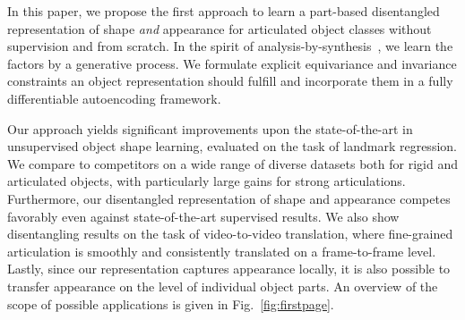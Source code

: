 In this paper, we propose the first approach to learn a part-based disentangled representation of shape \textit{and} appearance for articulated object classes %
without supervision and from scratch.
In the spirit of analysis-by-synthesis~\cite{Yildirim:2015ur}, we learn the factors by a generative process.
We formulate %
explicit equivariance and invariance constraints an object representation should fulfill
and incorporate them in a fully differentiable autoencoding framework.

Our approach yields significant improvements upon the state-of-the-art in unsupervised object shape learning, evaluated on the task of landmark regression.
We compare to competitors on a wide range of diverse datasets both for rigid and articulated objects, with particularly large gains for strong articulations.
Furthermore, our disentangled representation of shape and appearance competes favorably even against state-of-the-art supervised results.
We also show disentangling results on the task of video-to-video translation, where fine-grained articulation is smoothly and consistently translated on a frame-to-frame level.
Lastly, since our representation captures appearance locally, it is also possible to transfer
appearance on the level of individual object parts. An overview of the scope of possible applications is given in Fig.~\ref{fig:firstpage}.
